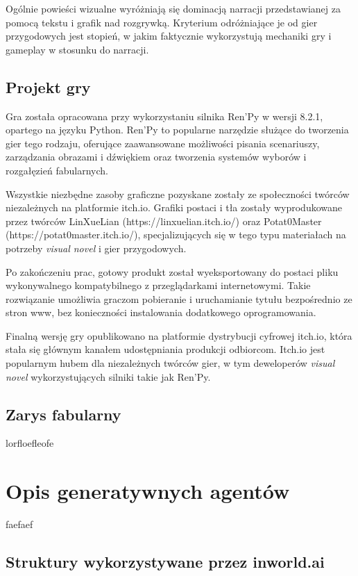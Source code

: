 Ogólnie powieści wizualne wyróżniają się dominacją narracji przedstawianej za pomocą tekstu i grafik nad 
rozgrywką. Kryterium odróżniające je od gier przygodowych jest stopień, w jakim faktycznie 
wykorzystują mechaniki gry i gameplay w stosunku do narracji\cite{tvtropes_visual_novel}.

\subsection*{Projekt gry}

Gra została opracowana przy wykorzystaniu silnika Ren'Py w wersji 8.2.1, opartego na języku Python. 
Ren'Py to popularne narzędzie służące do tworzenia gier tego rodzaju, oferujące zaawansowane 
możliwości pisania scenariuszy, zarządzania obrazami i dźwiękiem oraz tworzenia systemów wyborów 
i rozgałęzień fabularnych.

Wszystkie niezbędne zasoby graficzne pozyskane zostały ze społeczności twórców niezależnych na 
platformie itch.io. Grafiki postaci i tła zostały wyprodukowane przez twórców 
LinXueLian (https://linxuelian.itch.io/) oraz Potat0Master (https://potat0master.itch.io/), 
specjalizujących się w tego typu materiałach na potrzeby \textit{visual novel} i gier przygodowych.

Po zakończeniu prac, gotowy produkt został wyeksportowany do postaci pliku wykonywalnego 
kompatybilnego z przeglądarkami internetowymi. Takie rozwiązanie umożliwia graczom pobieranie i 
uruchamianie tytułu bezpośrednio ze stron www, bez konieczności instalowania dodatkowego 
oprogramowania.

Finalną wersję gry opublikowano na platformie dystrybucji cyfrowej itch.io, która stała się 
głównym kanałem udostępniania produkcji odbiorcom. Itch.io jest popularnym hubem dla niezależnych 
twórców gier, w tym deweloperów \textit{visual novel} wykorzystujących silniki takie jak Ren'Py.

\subsection*{Zarys fabularny}

lorfloefleofe

\section{Opis generatywnych agentów}\label{section:ch4_2}

faefaef

\subsection*{Struktury wykorzystywane przez inworld.ai}

